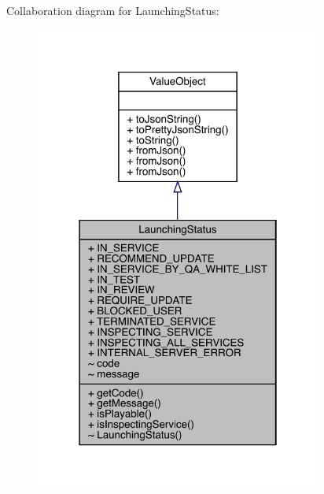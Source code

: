 Collaboration diagram for Launching\+Status\+:
\nopagebreak
\begin{figure}[H]
\begin{center}
\leavevmode
\includegraphics[width=267pt]{classcom_1_1toast_1_1android_1_1gamebase_1_1launching_1_1data_1_1_launching_status__coll__graph}
\end{center}
\end{figure}
